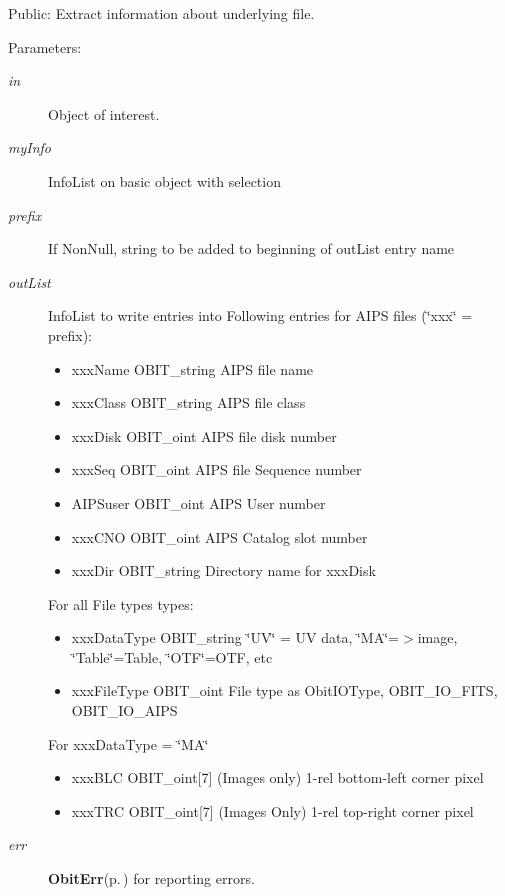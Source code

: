 Public: Extract information about underlying file. 

\begin{Desc}
\item[Parameters:]
\begin{description}
\item[{\em in}]Object of interest. \item[{\em my\-Info}]Info\-List on basic object with selection \item[{\em prefix}]If Non\-Null, string to be added to beginning of out\-List entry name \item[{\em out\-List}]Info\-List to write entries into Following entries for AIPS files (\char`\"{}xxx\char`\"{} = prefix): \begin{itemize}
\item xxx\-Name OBIT\_\-string AIPS file name \item xxx\-Class OBIT\_\-string AIPS file class \item xxx\-Disk OBIT\_\-oint AIPS file disk number \item xxx\-Seq OBIT\_\-oint AIPS file Sequence number \item AIPSuser OBIT\_\-oint AIPS User number \item xxx\-CNO OBIT\_\-oint AIPS Catalog slot number \item xxx\-Dir OBIT\_\-string Directory name for xxx\-Disk\end{itemize}
For all File types types: \begin{itemize}
\item xxx\-Data\-Type OBIT\_\-string \char`\"{}UV\char`\"{} = UV data, \char`\"{}MA\char`\"{}=$>$image, \char`\"{}Table\char`\"{}=Table, \char`\"{}OTF\char`\"{}=OTF, etc \item xxx\-File\-Type OBIT\_\-oint File type as Obit\-IOType, OBIT\_\-IO\_\-FITS, OBIT\_\-IO\_\-AIPS\end{itemize}
For xxx\-Data\-Type = \char`\"{}MA\char`\"{} \begin{itemize}
\item xxx\-BLC OBIT\_\-oint[7] (Images only) 1-rel bottom-left corner pixel \item xxx\-TRC OBIT\_\-oint[7] (Images Only) 1-rel top-right corner pixel \end{itemize}
\item[{\em err}]{\bf Obit\-Err}{\rm (p.\,\pageref{structObitErr})} for reporting errors. \end{description}
\end{Desc}
